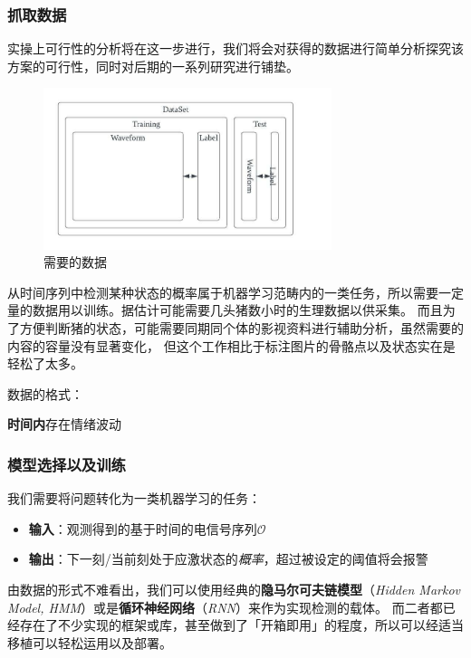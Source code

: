 \documentclass[UTF8]{ctexart}
\begin{document}
\subsubsection{抓取数据}

实操上可行性的分析将在这一步进行，我们将会对获得的数据进行简单分析探究该方案的可行性，同时对后期的一系列研究进行铺垫。

\begin{figure}[H]
\includegraphics[width=0.75\textwidth]{ds.jpeg}
\centering
\caption{需要的数据}
\end{figure}

从时间序列中检测某种状态的概率属于机器学习范畴内的一类任务，所以需要一定量的数据用以训练。据估计可能需要几头猪数小时的生理数据以供采集。
而且为了方便判断猪的状态，可能需要同期同个体的影视资料进行辅助分析，虽然需要的内容的容量没有显著变化，
但这个工作相比于标注图片的骨骼点以及状态实在是轻松了太多。

\par
数据的格式：
\begin{itemize}
    \textbf{时间内}存在情绪波动
\end{itemize}

\subsubsection{模型选择以及训练}

我们需要将问题转化为一类机器学习的任务：
\begin{itemize}
    \item\textbf{输入}：观测得到的基于时间的电信号序列$\mathscr{O}$
    \item\textbf{输出}：下一刻/当前刻处于应激状态的\emph{概率}，超过被设定的阈值将会报警
\end{itemize}

由数据的形式不难看出，我们可以使用经典的\textbf{隐马尔可夫链模型}（\emph{Hidden Markov Model, HMM}）或是\textbf{循环神经网络}（\emph{RNN}）来作为实现检测的载体。
而二者都已经存在了不少实现的框架或库，甚至做到了「开箱即用」的程度，所以可以经适当移植可以轻松运用以及部署。
\end{document}
